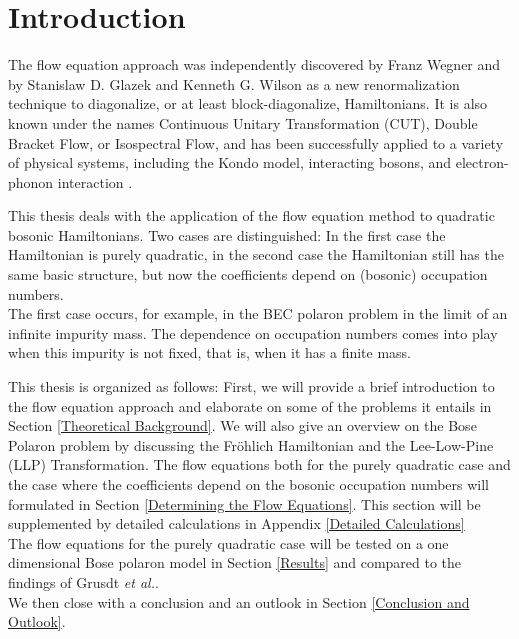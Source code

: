 \chapter{Introduction}
The flow equation approach was independently discovered by Franz Wegner \cite{https://doi.org/10.1002/andp.19945060203} and by Stanislaw D. Glazek and Kenneth G. Wilson \cite{PhysRevD.48.5863} as a new renormalization technique to diagonalize, or at least block-diagonalize, Hamiltonians. It is also known under the names Continuous Unitary Transformation (CUT), Double Bracket Flow, or Isospectral Flow, and has been successfully applied to a variety of physical systems, including the Kondo model, interacting bosons, and electron-phonon interaction \cite{Wegner_2006}.\par
This thesis deals with the application of the flow equation method to quadratic bosonic Hamiltonians. Two cases are distinguished: In the first case the Hamiltonian is purely quadratic, in the second case the Hamiltonian still has the same basic structure, but now the coefficients depend on (bosonic) occupation numbers.\\
The first case occurs, for example, in the BEC polaron problem in the limit of an infinite impurity mass. The dependence on occupation numbers comes into play when this impurity is not fixed, that is, when it has a finite mass.\par
This thesis is organized as follows: First, we will provide a brief introduction to the flow equation approach and elaborate on some of the problems it entails in Section \ref{Theoretical Background}. We will also give an overview on the Bose Polaron problem by discussing the Fröhlich Hamiltonian and the Lee-Low-Pine (LLP) Transformation. The flow equations  both for the purely quadratic case and the case where the coefficients depend on the bosonic occupation numbers will formulated in Section \ref{Determining the Flow Equations}. This section will be supplemented by detailed calculations in Appendix \ref{Detailed Calculations}\\
The flow equations for the purely quadratic case will be tested on a one dimensional Bose polaron model in Section \ref{Results} and compared to the findings of Grusdt \emph{et al.}\cite{Grusdt_2017}. \\
We then close with a conclusion and an outlook in Section \ref{Conclusion and Outlook}.
